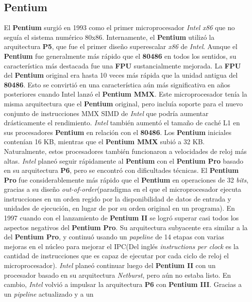 \subsection{Pentium}

El \textbf{Pentium} surgió en 1993 como el primer microprocesador \emph{Intel x86} que no seguía el sistema numérico 80x86. Internamente, el \textbf{Pentium} utilizó 
la arquitectura \textbf{P5}, que fue el primer diseño superescalar \emph{x86} de \emph{Intel}. Aunque el \textbf{Pentium} fue generalmente más rápido que 
el \textbf{80486} en todos los sentidos, su característica más destacada fue una \textbf{FPU} sustancialmente mejorada. La \textbf{FPU} del \textbf{Pentium} original 
era hasta 10 veces más rápida que la unidad antigua del \textbf{80486}. Esto se convirtió en una característica aún más significativa en años posteriores cuando Intel 
lanzó el \textbf{Pentium MMX}. Este microprocesador tenía la misma arquitectura que el \textbf{Pentium} original, pero incluía soporte para el nuevo conjunto de instrucciones 
MMX SIMD de \emph{Intel} que podría aumentar drásticamente el rendimiento. \emph{Intel} también aumentó el tamaño de caché L1 en sus procesadores \textbf{Pentium} en relación con el \textbf{80486}. 
Los \textbf{Pentium} iniciales contenían 16 KB, mientras que el \textbf{Pentium MMX} subió a 32 KB. Naturalmente, estos procesadores también funcionaron a velocidades de reloj más altas. 
\emph{Intel} planeó seguir rápidamente al \textbf{Pentium} con el \textbf{Pentium Pro} basado en su arquitectura \textbf{P6}, pero se encontró con dificultades técnicas. El \textbf{Pentium Pro} 
fue considerablemente más rápido que el \textbf{Pentium} en operaciones de 32 \emph{bits}, gracias a su diseño \emph{out-of-order}(paradigma en el que el microprocesador ejecuta 
instrucciones en un orden regido por la disponibilidad de datos de entrada y unidades de ejecución, en lugar de por su orden original en un programa). En 1997 cuando con el lanzamiento de 
\textbf{Pentium II} se logró superar casi todos los aspectos negativos del \textbf{Pentium Pro}. Su arquitectura subyacente era similar a la del \textbf{Pentium Pro}, 
y continuó usando un \emph{papeline} de 14 etapas con varias mejoras en el núcleo para mejorar el IPC(Del inglés \emph{instructions per clock} es la cantidad de instrucciones que es 
capaz de ejecutar por cada ciclo de reloj el microprocesador). \emph{Intel} planeó continuar luego  del \textbf{Pentium II} con un procesador basado en su arquitectura \emph{Netburst}, 
pero aún no estaba listo. En cambio, \emph{Intel} volvió a impulsar la arquitectura \textbf{P6} con \textbf{Pentium III}. Gracias a un \emph{pipeline} actualizado y a un 
